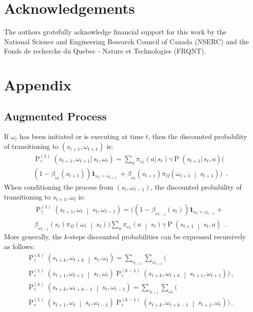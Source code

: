 \documentclass[letterpaper]{article}
\def\given{\;\middle\vert\;}
\def\indicator{\mathbf{1}}
\DeclareMathOperator{\prob}{P}
\def\option{\omega}
\begin{document}
\section{Acknowledgements}
The authors gratefully acknowledge financial support for this work by the National
Science and Engineering Research Council of Canada (NSERC) and the Fonds de
recherche du Quebec - Nature et Technologies (FRQNT).

\section{Appendix}

\subsection*{Augmented Process}
If $\omega_t$ has been
initiated or is executing at time $t$,
then the discounted probability of transitioning to $(s_{t+1}, \omega_{t+1})$ is:
\begin{align*}
&\prob^{(1)}_\gamma\left(s_{t+1}, \omega_{t+1} |\, s_t, \omega_t \right) = \sum_{a} \pi_{\omega_t}\left(a |\, s_t \right)\gamma \prob(s_{t+1} |\, s_t, a)\big( \\
& (1 - \beta_{\omega_t}(s_{t+1}))\indicator_{\omega_{t}=\omega_{t+1}} \
+ \beta_{\omega_{t}}(s_{t+1})\pi_\Omega\left(\omega_{t+1} \given s_{t+1}\right)\big) \enspace .
\end{align*}
When conditioning the process from $(s_t, \omega_{t-1})$, the discounted probability of transitioning to
$s_{t+1}, \omega_{t}$ is:
\begin{align*}
&\prob^{(1)}_\gamma\left(s_{t+1}, \omega_{t} \given s_t, \omega_{t-1} \right) = \big( (1 - \beta_{\omega_{t-1}}(s_{t}))\indicator_{\omega_{t}=\omega_{t-1}} + \\
&\beta_{\omega_{t-1}}(s_{t})\pi_\Omega\left(\omega_{t} \given s_{t}\right)\big)
 \sum_{a} \pi_{\omega_t}\left(a \given s_{t}\right) \gamma \prob\left(s_{t+1} \given s_t, a\right) \enspace .
\end{align*}
More generally, the $k$-steps discounted probabilities can be expressed
recursively as follows:
\begin{align*}
&\prob^{(k)}_\gamma\left(s_{t+k}, \omega_{t+k}\given s_t, \omega_{t}\right) = \sum_{s_{t+1}} \sum_{\option_{t+1}} \big( \\
& \prob_\gamma^{(1)}\left( s_{t+1}, \omega_{t+1} \given s_{t}, \omega_{t} \right)\prob_\gamma^{(k-1)}\left( s_{t+k}, \omega_{t+k} \given s_{t+1}, \omega_{t+1} \right) \big) \, ,\\
&\prob^{(k)}_\gamma\left(s_{t+k}, \omega_{t+k-1}\given s_t, \omega_{t-1}\right) = \sum_{s_{t+1}} \sum_{\option_{t}} \big( \\
&\prob_\gamma^{(1)}\left( s_{t+1}, \omega_t \given s_{t}, \omega_{t-1} \right) \prob_\gamma^{(k-1)}\left( s_{t+k}, \omega_{t+k-1} \given s_{t+1}, \omega_{t} \right) \big) \, .
\end{align*}
\end{document}
